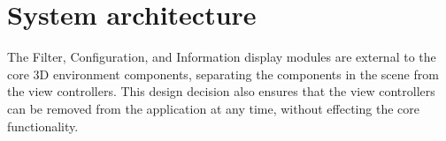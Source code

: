 \section{System architecture} {
\label{sec:system_architecture}
	


		The Filter, Configuration, and Information display modules are external to the core 3D environment components, separating the components in the scene from the view controllers. This design decision also ensures that the view controllers can be removed from the application at any time, without effecting the core functionality.



}
